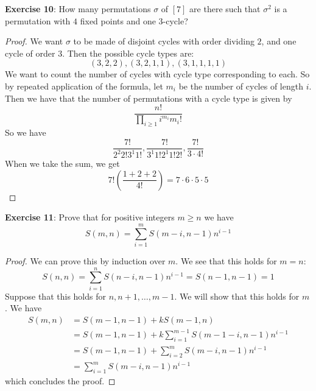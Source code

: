 \documentclass{article}
\begin{document}
\textbf{Exercise 10}: How many permutations $\sigma$ of $[7]$ are there such that $\sigma^{2}$ is a permutation with $4$ fixed points and one $3$-cycle?
    \begin{proof}
        We want $\sigma$ to be made of disjoint cycles with order dividing $2$, and one cycle of order $3$. Then the possible cycle types are:
            \begin{equation*}
                (3, 2, 2), (3, 2, 1, 1), (3, 1, 1, 1, 1)
            \end{equation*}
        We want to count the number of cycles with cycle type corresponding to each. So by repeated application of the formula, let $m_{i}$ be the number of cycles of length $i$. Then we have that the number of permutations with a cycle type is given by
            \begin{equation*}
                \dfrac{n!}{\prod_{i \geq 1}i^{m_{i}} m_{i}!}
            \end{equation*}
        So we have
            \begin{equation*}
                \dfrac{7!}{2^{2}2!3^{1}1!}, \dfrac{7!}{3^{1}1!2^{1}1!2!}, \dfrac{7!}{3\cdot 4!}
            \end{equation*}
        When we take the sum, we get
            \begin{equation*}
                7!(\dfrac{1 + 2 + 2}{4!}) = 7 \cdot 6 \cdot 5 \cdot 5
            \end{equation*}
    \end{proof}

\textbf{Exercise 11}: Prove that for positive integers $m \geq n$ we have
    \begin{equation*}
        S(m, n) = \sum_{i = 1}^{m}S(m - i, n - 1)n^{i - 1}
    \end{equation*}
    \begin{proof}
        We can prove this by induction over $m$. We see that this holds for $m = n$:
            \begin{equation*}
                S(n, n) = \sum_{i = 1}^{n}S(n - i, n - 1)n^{i - 1} = S(n - 1, n - 1) = 1
            \end{equation*}
        Suppose that this holds for $n, n + 1, \ldots, m - 1$. We will show that this holds for $m$. We have 
            \begin{align*}
                S(m, n) &= S(m - 1, n - 1) + kS(m - 1, n) \\
                        &= S(m - 1, n - 1) + k\sum_{i = 1}^{m - 1}S(m - 1 - i, n - 1)n^{i - 1} \\
                        &= S(m - 1, n - 1) + \sum_{i = 2}^{m}S(m - i, n - 1)n^{i - 1} \\
                        &= \sum_{i = 1}^{m}S(m - i, n - 1)n^{i - 1}
            \end{align*}
        which concludes the proof.
    \end{proof}
\end{document}
